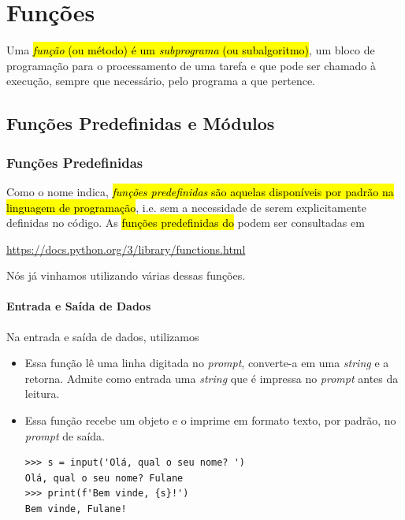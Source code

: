 
\chapter{Funções}\label{cap_fun}

Uma \hl{\emph{função} (ou método) é um \emph{subprograma} (ou subalgoritmo)}, um bloco de programação para o processamento de uma tarefa e que pode ser chamado à execução, sempre que necessário, pelo programa a que pertence.

\section{Funções Predefinidas e Módulos}\label{cap_fun_sec_buildin}

\subsection{Funções Predefinidas}

Como o nome indica, \hl{\emph{funções predefinidas} são aquelas disponíveis por padrão na linguagem de programação}, i.e. sem a necessidade de serem explicitamente definidas no código. As \hl{funções predefinidas do {\python}} podem ser consultadas em
\begin{center}
  \url{https://docs.python.org/3/library/functions.html}
\end{center}

Nós já vinhamos utilizando várias dessas funções.

\subsubsection{Entrada e Saída de Dados}

Na entrada e saída de dados, utilizamos
\begin{itemize}
\item {\PYTHONinput} 

  Essa função lê uma linha digitada no \textit{prompt}, converte-a em uma \textit{string} e a retorna. Admite como entrada uma \textit{string} que é impressa no \textit{prompt} antes da leitura.

\item {\PYTHONprint} 

  Essa função recebe um objeto e o imprime em formato texto, por padrão, no \textit{prompt} de saída.

\begin{lstlisting}[xrightmargin=2.5em]
>>> s = input('Olá, qual o seu nome? ')
Olá, qual o seu nome? Fulane
>>> print(f'Bem vinde, {s}!')
Bem vinde, Fulane!
\end{lstlisting}

\end{itemize}


